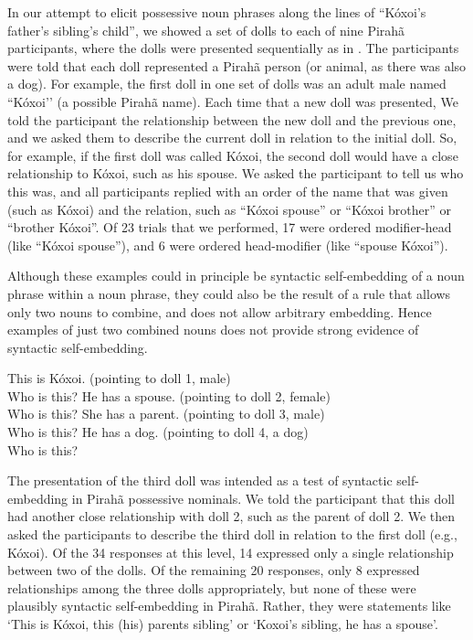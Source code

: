 \documentclass{article}
\begin{document}
In our attempt to elicit possessive noun phrases along the lines of ``Kóxoi’s father’s sibling’s child'', we showed a set of dolls to each of nine Pirahã participants, where the dolls were presented sequentially as in . The participants were told that each doll represented a Pirahã person (or animal, as there was also a dog). For example, the first doll in one set of dolls was an adult male named ``Kóxoi’' (a possible Pirahã name). Each time that a new doll was presented, We told the participant the relationship between the new doll and the previous one, and we asked them to describe the current doll in relation to the initial doll.  So, for example, if the first doll was called Kóxoi, the second doll would have a close relationship to Kóxoi, such as his spouse. We asked the participant to tell us who this was, and all participants  replied with an order of the name that was given (such as Kóxoi) and the relation, such as ``Kóxoi spouse'' or ``Kóxoi brother'' or ``brother Kóxoi''. Of 23 trials that we performed, 17 were ordered modifier-head (like ``Kóxoi spouse''), and 6 were ordered head-modifier (like ``spouse Kóxoi'').

Although these examples could in principle be syntactic self-embedding of a noun phrase within a noun phrase, they could also be the result of a rule that allows only two nouns to combine, and does not allow arbitrary embedding.  Hence examples of just two combined nouns does not provide strong evidence of syntactic self-embedding.

\eal
\label{kohoi_ex}
\ex \label{kohoi_ex1} This is Kóxoi. (pointing to doll 1, male)\\
Who is this?
\ex \label{kohoi_ex2} He has a spouse. (pointing to doll 2, female)\\
Who is this?
\ex \label{kohoi_ex3} She has a parent. (pointing to doll 3, male)\\
Who is this?
\ex \label{kohoi_ex4} He has a dog. (pointing to doll 4, a dog)\\
Who is this?
\zl

The presentation of the third doll was intended as a test of syntactic self-embedding in Pirahã possessive nominals.  We told the participant that this doll had another close relationship with doll 2, such as the parent of doll 2.  We then asked the participants to describe the third doll in relation to the first doll (e.g., Kóxoi).  Of the 34 responses at this level, 14 expressed only a single relationship between two of the dolls.  Of the remaining 20 responses, only 8 expressed relationships among the three dolls appropriately, but none of these were plausibly syntactic self-embedding in Pirahã.  Rather, they were statements like ‘This is Kóxoi, this (his) parents sibling’ or ‘Koxoi’s sibling, he has a spouse’.
\end{document}
